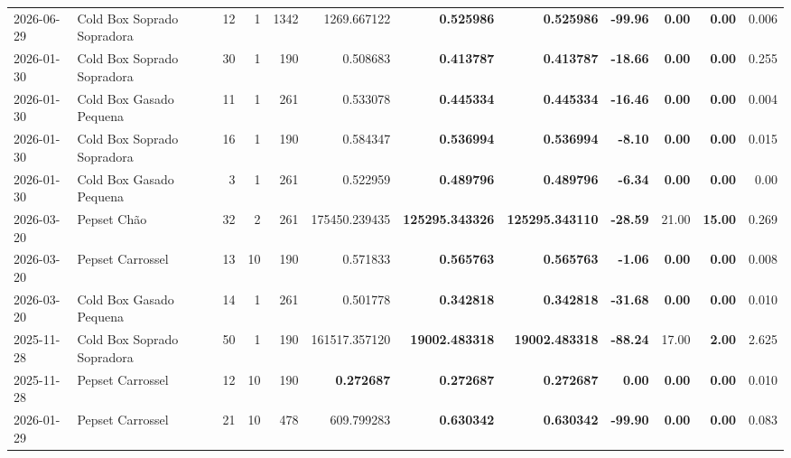 {\begin{center}
{\begin{tabular}{@{}llrrrrrrrrrr@{}}
2026-06-29 & Cold Box Soprado Sopradora & 12 & 1 & 1342 & 1269.667122 & \textbf{0.525986} & \textbf{0.525986} & \textbf{-99.96} & \textbf{0.00} & \textbf{0.00} & 0.006 \\
2026-01-30 & Cold Box Soprado Sopradora & 30 & 1 & 190 & 0.508683 & \textbf{0.413787} & \textbf{0.413787} & \textbf{-18.66} & \textbf{0.00} & \textbf{0.00} & 0.255 \\
2026-01-30 & Cold Box Gasado Pequena & 11 & 1 & 261 & 0.533078 & \textbf{0.445334} & \textbf{0.445334} & \textbf{-16.46} & \textbf{0.00} & \textbf{0.00} & 0.004 \\
2026-01-30 & Cold Box Soprado Sopradora & 16 & 1 & 190 & 0.584347 & \textbf{0.536994} & \textbf{0.536994} & \textbf{-8.10} & \textbf{0.00} & \textbf{0.00} & 0.015 \\
2026-01-30 & Cold Box Gasado Pequena & 3 & 1 & 261 & 0.522959 & \textbf{0.489796} & \textbf{0.489796} & \textbf{-6.34} & \textbf{0.00} & \textbf{0.00} & 0.00 \\
2026-03-20 & Pepset Chão & 32 & 2 & 261 & 175450.239435 & \textbf{125295.343326} & \textbf{125295.343110} & \textbf{-28.59} & 21.00 & \textbf{15.00} & 0.269 \\
2026-03-20 & Pepset Carrossel & 13 & 10 & 190 & 0.571833 & \textbf{0.565763} & \textbf{0.565763} & \textbf{-1.06} & \textbf{0.00} & \textbf{0.00} & 0.008 \\
2026-03-20 & Cold Box Gasado Pequena & 14 & 1 & 261 & 0.501778 & \textbf{0.342818} & \textbf{0.342818} & \textbf{-31.68} & \textbf{0.00} & \textbf{0.00} & 0.010 \\
2025-11-28 & Cold Box Soprado Sopradora & 50 & 1 & 190 & 161517.357120 & \textbf{19002.483318} & \textbf{19002.483318} & \textbf{-88.24} & 17.00 & \textbf{2.00} & 2.625 \\
2025-11-28 & Pepset Carrossel & 12 & 10 & 190 & \textbf{0.272687} & \textbf{0.272687} & \textbf{0.272687} & \textbf{0.00} & \textbf{0.00} & \textbf{0.00} & 0.010 \\
2026-01-29 & Pepset Carrossel & 21 & 10 & 478 & 609.799283 & \textbf{0.630342} & \textbf{0.630342} & \textbf{-99.90} & \textbf{0.00} & \textbf{0.00} & 0.083 \\
\bottomrule
\end{tabular}%
}
\end{center}
}
\vspace*{\fill}
\newpage
\vspace*{\fill}
